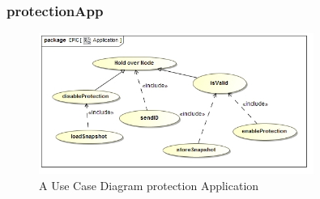 \documentclass[a4paper,12pt,titlepage]{article}
\begin{document}
		\subsubsection{protectionApp}
		\begin{figure}[h!]
 			 \centering
			  \includegraphics[width=0.8\textwidth]{ApplicationUseCase}
		 	 \caption{A Use Case Diagram protection Application}
		\end{figure}
\end{document}
